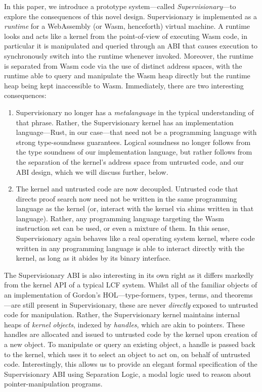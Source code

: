 \documentclass[a4paper, 10pt]{article}
\begin{document}
In this paper, we introduce a prototype system---called \emph{Supervisionary}---to explore the consequences of this novel design.
Supervisionary is implemented as a \emph{runtime} for a WebAssembly (or Wasm, henceforth) virtual machine.
A runtime looks and acts like a kernel from the point-of-view of executing Wasm code, in particular it is manipulated and queried through an ABI that causes execution to synchronously switch into the runtime whenever invoked.
Moreover, the runtime is separated from Wasm code via the use of distinct address spaces, with the runtime able to query and manipulate the Wasm heap directly but the runtime heap being kept inaccessible to Wasm.
Immediately, there are two interesting consequences:

\begin{enumerate}
\item
Supervisionary no longer has a \emph{metalanguage} in the typical understanding of that phrase.
Rather, the Supervisionary kernel has an implementation language---Rust, in our case---that need not be a programming language with strong type-soundness guarantees. Logical soundness no longer follows from the type soundness of our implementation language, but rather follows from the separation of the kernel's address space from untrusted code, and our ABI design, which we will discuss further, below.
\item
The kernel and untrusted code are now decoupled.
Untrusted code that directs proof search now need not be written in the same programming language as the kernel (or, interact with the kernel via shims written in that language).
Rather, any programming language targeting the Wasm instruction set can be used, or even a mixture of them.
In this sense, Supervisionary again behaves like a real operating system kernel, where code written in any programming language is able to interact directly with the kernel, as long as it abides by its binary interface.
\end{enumerate}

The Supervisionary ABI is also interesting in its own right as it differs markedly from the kernel API of a typical LCF system.
Whilst all of the familiar objects of an implementation of Gordon's HOL---type-formers, types, terms, and theorems---are still present in Supervisionary, these are never \emph{directly} exposed to untrusted code for manipulation.
Rather, the Supervisionary kernel maintains internal heaps of \emph{kernel objects}, indexed by \emph{handles}, which are akin to pointers.
These handles are allocated and issued to untrusted code by the kernel upon creation of a new object.
To manipulate or query an existing object, a handle is passed back to the kernel, which uses it to select an object to act on, on behalf of untrusted code.
Interestingly, this allows us to provide an elegant formal specification of the Supervisionary ABI using Separation Logic, a modal logic used to reason about pointer-manipulation programs.
\end{document}
